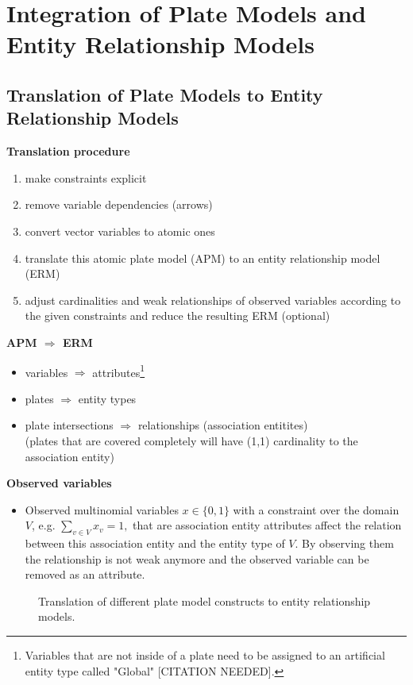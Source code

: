 \section{Integration of Plate Models and Entity Relationship Models}

\subsection{Translation of Plate Models to Entity Relationship Models}

\textbf{Translation procedure}
\begin{enumerate}
\item make constraints explicit
\item remove variable dependencies (arrows)
\item convert vector variables to atomic ones
\item translate this atomic plate model (APM) to an entity relationship model (ERM)
\item adjust cardinalities and weak relationships of observed variables according to the given constraints and reduce the resulting ERM (optional)
\end{enumerate}

\textbf{APM $\Rightarrow$ ERM}
\begin{itemize}
\item variables $\Rightarrow$ attributes\footnote{Variables that are not inside of a plate need to be assigned to an artificial entity type called "Global" [CITATION NEEDED].}
\item plates $\Rightarrow$ entity types
\item plate intersections $\Rightarrow$ relationships (association entitites)\\
	(plates that are covered completely will have (1,1) cardinality to the association entity)
\end{itemize}

\textbf{Observed variables}
\begin{itemize}
\item Observed multinomial variables $x \in \{0,1\}$ with a constraint over the domain $V$, e.g. $\sum_{v \in V} x_v = 1,$ that are association entity attributes affect the relation between this association entity and the entity type of $V$. By observing them the relationship is not weak anymore and the observed variable can be removed as an attribute.
\end{itemize}

\begin{figure}
\centering
\resizebox{.9\linewidth}{!}{}
\caption{Translation of different plate model constructs to entity relationship models.}\label{fig:pm2erm}
\end{figure}

